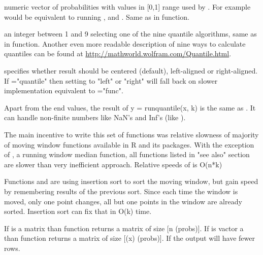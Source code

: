 \begin{Arguments}
\begin{ldescription}
\item[\code{probs}] numeric vector of probabilities with values in [0,1] range 
used by . For example  would be 
equivalent to running ,  and .
Same as  in  function. 
\item[\code{type}] an integer between 1 and 9 selecting one of the nine quantile 
algorithms, same as  in  function. 
Another even more readable description of nine ways to calculate quantiles 
can be found at \url{http://mathworld.wolfram.com/Quantile.html}. 
\item[\code{align}] specifies whether result should be centered (default), 
left-aligned or right-aligned.  If ="quantile" then setting
 to "left" or "right" will fall back on slower implementation 
equivalent to ="func". 
\end{ldescription}
\end{Arguments}
\begin{Details}\relax
Apart from the end values, the result of y = runquantile(x, k) is the same as 
. It can handle 
non-finite numbers like NaN's and Inf's (like ).

The main incentive to write this set of functions was relative slowness of 
majority of moving window functions available in R and its packages.  With the 
exception of , a running window median function, all 
functions listed in "see also" section are slower than very inefficient 
 approach. Relative 
speeds of  is O(n*k)

Functions  and  are using insertion sort to 
sort the moving window, but gain speed by remembering results of the previous 
sort. Since each time the window is moved, only one point changes, all but one 
points in the window are already sorted. Insertion sort can fix that in O(k) 
time.
\end{Details}
\begin{Value}
If  is a matrix than function  returns a matrix of 
size [n \eqn{\times}{} (probs)]. If  is vactor 
a than function  returns a matrix of size 
[(x) \eqn{\times}{} (probs)]. 
If  the output will have fewer rows.
\end{Value}
